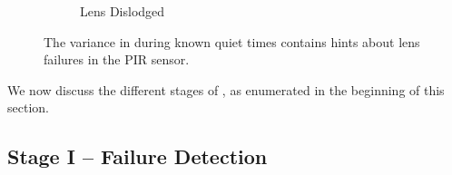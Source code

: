 \begin{figure}
\begin{subfigure}[t]{0.33\linewidth}
		\caption{Lens Dislodged}
		\label{fig:capoff}
	\end{subfigure}
	\caption{The variance in \aout during known quiet times contains hints about lens failures in the PIR sensor.}
	\label{fig:variance_cap_cases}
\end{figure}




We now discuss the different stages of \sol, as enumerated in the beginning of this section. 

\subsection{Stage I -- Failure Detection}
\label{subsec:fail_detection}


